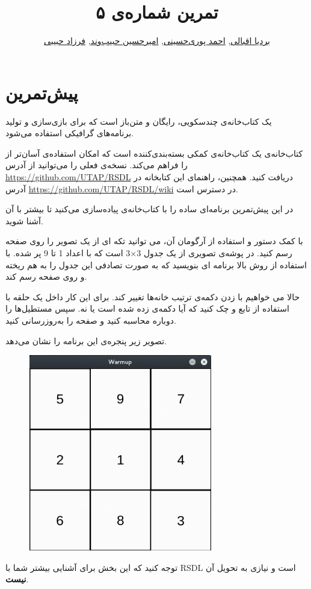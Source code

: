 \documentclass{utap}
\title{تمرین شماره‌ی ۵}
\author{
	\href{mailto:bardia.eghbali@gmail.com??subject=[AP\%20S98\%20A5]\%20}{بردیا اقبالی},
	\href{mailto:seyedahmadpourihosseini@gmail.com?subject=[AP\%20S98\%20A5]\%20}{احمد پوری‌حسینی},
	\href{mailto:ahhabibvand@gmail.com?subject=[AP\%20S98\%20A5]\%20}{امیرحسین حبیب‌وند},
	\href{mailto:farzadhabibii98@gmail.com?subject=[AP\%20S98\%20A5]\%20}{فرزاد حبیبی}
}
\begin{document}
	\maketitle

	\section{پیش‌تمرین }

  یک کتاب‌خانه‌ی چندسکویی، رایگان و متن‌باز است که برای بازی‌سازی و تولید برنامه‌های گرافیکی استفاده می‌شود.

کتاب‌خانه‌ی  یک کتاب‌خانه‌ی کمکی بسته‌بندی‌کننده است که امکان استفاده‌ی آسان‌تر از  را فراهم می‌کند.
نسخه‌ی فعلی  را می‌توانید از آدرس \url{https://github.com/UTAP/RSDL} دریافت کنید. همچنین، راهنمای این کتابخانه در آدرس \url{https://github.com/UTAP/RSDL/wiki} در دسترس است.

در این پیش‌تمرین برنامه‌ای ساده را با کتاب‌خانه‌ی  پیاده‌سازی می‌کنید تا بیشتر با آن آشنا شوید.


با کمک دستور  و استفاده از آرگومان  آن، می توانید تکه ای از یک تصویر را روی صفحه رسم کنید. در پوشه‌ی  تصویری از یک جدول 3×3 است که با اعداد 1 تا 9 پر شده. با استفاده از روش بالا برنامه ای بنویسید که به صورت تصادفی این جدول را به هم ریخته و روی صفحه رسم کند.

حالا می خواهیم با زدن دکمه‌ی  ترتیب خانه‌ها تغییر کند. برای این کار داخل یک حلقه با استفاده از تابع  و  چک کنید که آیا دکمه‌ی  زده شده است یا نه. سپس مستطیل‌ها را دوباره محاسبه کنید و صفحه را به‌روزرسانی کنید.

تصویر زیر پنجره‌ی این برنامه را نشان می‌دهد.
	\begin{figure}[H]
	\begin{center}
		\includegraphics[width=8cm]{warmup.png}
	\end{center}
	\end{figure}
توجه کنید که این بخش برای آشنایی بیشتر شما با RSDL است و نیازی به تحویل آن \textbf{نیست}.
\end{document}
